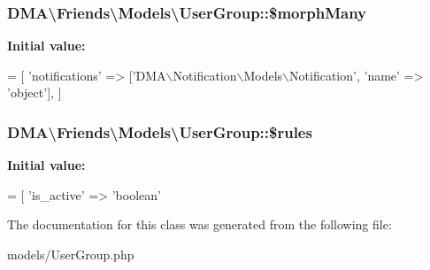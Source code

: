 \subsubsection[{\$morph\+Many}]{\setlength{\rightskip}{0pt plus 5cm}D\+M\+A\textbackslash{}\+Friends\textbackslash{}\+Models\textbackslash{}\+User\+Group\+::\$morph\+Many}\label{classDMA_1_1Friends_1_1Models_1_1UserGroup_ad71c8521c1767d621fe10ea3ce822c3c}
{\bfseries Initial value\+:}
\begin{DoxyCode}
= [
        \textcolor{stringliteral}{'notifications'}  => [\textcolor{stringliteral}{'DMA\(\backslash\)Notification\(\backslash\)Models\(\backslash\)Notification'}, \textcolor{stringliteral}{'name'} => \textcolor{stringliteral}{'object'}],
    ]
\end{DoxyCode}
\hypertarget{classDMA_1_1Friends_1_1Models_1_1UserGroup_afe3638379efd008d908f38c86b434c76}{}
\subsubsection[{\$rules}]{\setlength{\rightskip}{0pt plus 5cm}D\+M\+A\textbackslash{}\+Friends\textbackslash{}\+Models\textbackslash{}\+User\+Group\+::\$rules}\label{classDMA_1_1Friends_1_1Models_1_1UserGroup_afe3638379efd008d908f38c86b434c76}
{\bfseries Initial value\+:}
\begin{DoxyCode}
= [
        \textcolor{stringliteral}{'is\_active'} => \textcolor{stringliteral}{'boolean'}
\end{DoxyCode}


The documentation for this class was generated from the following file\+:\begin{DoxyCompactItemize}
\item 
models/User\+Group.\+php\end{DoxyCompactItemize}
